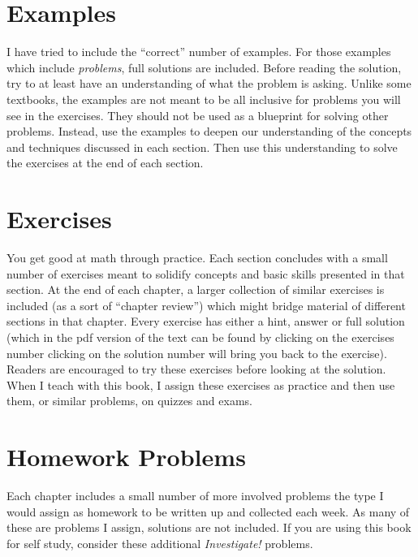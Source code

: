\documentclass[10pt,]{book}
\theoremstyle{plain}
\theoremstyle{definition}
\theoremstyle{definition}
\theoremstyle{definition}
\numberwithin{equation}{section}
\begin{document}
\chapter*{Examples}\label{preface-4}

  I have tried to include the ``correct'' number of examples. For those examples which include \emph{problems}, full solutions are included. Before reading the solution, try to at least have an understanding of what the problem is asking. Unlike some textbooks, the examples are not meant to be all inclusive for problems you will see in the exercises. They should not be used as a blueprint for solving other problems. Instead, use the examples to deepen our understanding of the concepts and techniques discussed in each section. Then use this understanding to solve the exercises at the end of each section.
\chapter*{Exercises}\label{preface-5}

  You get good at math through practice. Each section concludes with a small number of exercises meant to solidify concepts and basic skills presented in that section. At the end of each chapter, a larger collection of similar exercises is included (as a sort of ``chapter review'') which might bridge material of different sections in that chapter. Every exercise has either a hint, answer or full solution (which in the pdf version of the text can be found by clicking on the exercises number \textendash{} clicking on the solution number will bring you back to the exercise). Readers are encouraged to try these exercises before looking at the solution. When I teach with this book, I assign these exercises as practice and then use them, or similar problems, on quizzes and exams.
\chapter*{Homework Problems}\label{preface-6}

       Each chapter includes a small number of more involved problems \textendash{} the type I would assign as homework to be written up and collected each week. As many of these are problems I assign, solutions are not included. If you are using this book for self study, consider these additional \emph{Investigate!} problems.
\end{document}
